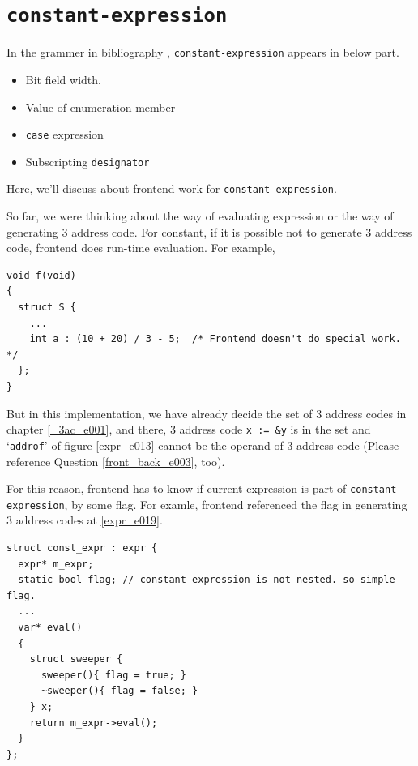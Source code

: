 \section{\tt{constant-expression}}
In the grammer in bibliography \cite{ISO},
{\tt{constant-expression}} appears in below part.
\begin{itemize}
\item Bit field width.
\item Value of enumeration member
\item {\tt{case}} expression
\item Subscripting {\tt{designator}}
\end{itemize}
Here, we'll discuss about frontend work for {\tt{constant-expression}}.

So far, we were thinking about the way of evaluating expression
or the way of generating 3 address code. For constant,
if it is possible not to generate 3 address code, frontend does
run-time evaluation. For example,
\begin{verbatim}
void f(void)
{
  struct S {
    ...
    int a : (10 + 20) / 3 - 5;  /* Frontend doesn't do special work. */
  };
}
\end{verbatim}
But in this implementation,
we have already decide the set of 3 address codes in chapter 
\ref{_3ac_e001}, and there, 3 address code {\tt{x := \&y}}
is in the set and `{\tt{addrof}}' of figure \ref{expr_e013}
cannot be the operand of 3 address code
(Please reference Question \ref{front_back_e003}, too).

For this reason, frontend has to know if
current expression is part of {\tt{constant-expression}}, by some flag.
For examle, frontend referenced the flag in generating 3 address codes
at \ref{expr_e019}.

\begin{verbatim}
struct const_expr : expr {
  expr* m_expr;
  static bool flag; // constant-expression is not nested. so simple flag.
  ...
  var* eval()
  {
    struct sweeper {
      sweeper(){ flag = true; }
      ~sweeper(){ flag = false; }
    } x;
    return m_expr->eval();
  }
};
\end{verbatim}

